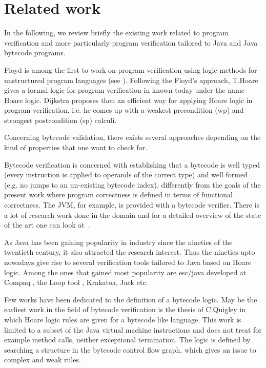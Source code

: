 \section{Related work} \label{relWorkWp}

In the following, we review briefly the existing work related to program verification
 and more particularly program verification tailored to Java and Java bytecode programs. 


 Floyd is among the first to work on program verification using logic methods for unstructured program
 languages (see \cite{F67amp}). Following the Floyd's approach, T.Hoare gives a formal logic for program verification in \cite{Hoare69ABC} known
 today under the name Hoare logic. Dijkstra \cite{WPCDS} proposes then an efficient way for applying Hoare logic in
 program verification, i.e. he comes up with a weakest precondition (wp) and strongest postcondition (sp) calculi. 

Concerning bytecode validation, there exists several approaches depending on the kind of properties that one want to check for.
 
 Bytecode verification is concerned with establishing that a bytecode is well typed 
(every instruction is applied to operands of the correct type) and well formed 
(e.g. no jumps to an un-existing bytecode index), differently from the goals of the present
work where program correctness is defined in terms of functional correctness. The JVM, for example, 
is provided with a bytecode verifier. There is a lot of research work done in the domain 
and for a detailed overview of the state of the art one can look at~\cite{Ljbc}.  

As Java has been gaining popularity in industry since the nineties of the twentieth century,
it also attracted the research interest.   
Thus the nineties upto nowadays give rise to several verification tools tailored to Java
 based on Hoare logic. Among the ones that gained most popularity are
esc/java developed at Compaq \cite{escjava}, the Loop tool \cite{jacobs03java}, Krakatoa, Jack \cite{BRL-JACK} etc.   

Few works have been dedicated to the definition of a bytecode logic. May be the earliest work in the field of bytecode verification 
is the thesis of C.Quigley  \cite{Quigley03PLJ} in which Hoare logic rules are given for a bytecode like language. This work is limited 
to a subset of the Java virtual machine instructions and does not treat for example method calls,
 neither exceptional termination. The logic is defined by searching a structure in the bytecode control flow graph,
 which gives an issue to complex and weak rules.

